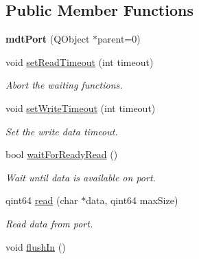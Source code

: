 \subsection*{Public Member Functions}
\begin{DoxyCompactItemize}
\item 
\hypertarget{classmdt_port_ac466eac9d1a54ea0e04c998660ad75ec}{
{\bfseries mdtPort} (QObject $\ast$parent=0)}
\label{classmdt_port_ac466eac9d1a54ea0e04c998660ad75ec}

\item 
void \hyperlink{classmdt_port_aa77b266f23744f1b53ae589f986be101}{setReadTimeout} (int timeout)
\begin{DoxyCompactList}\small\item\em Abort the waiting functions. \end{DoxyCompactList}\item 
\hypertarget{classmdt_port_a2acb6e7bedacdadf78ee735dc611abfa}{
void \hyperlink{classmdt_port_a2acb6e7bedacdadf78ee735dc611abfa}{setWriteTimeout} (int timeout)}
\label{classmdt_port_a2acb6e7bedacdadf78ee735dc611abfa}

\begin{DoxyCompactList}\small\item\em Set the write data timeout. \end{DoxyCompactList}\item 
bool \hyperlink{classmdt_port_af8737cc14667f6770af7be01759253e2}{waitForReadyRead} ()
\begin{DoxyCompactList}\small\item\em Wait until data is available on port. \end{DoxyCompactList}\item 
qint64 \hyperlink{classmdt_port_ad8a196bb21b6ca76dffb068a1692904a}{read} (char $\ast$data, qint64 maxSize)
\begin{DoxyCompactList}\small\item\em Read data from port. \end{DoxyCompactList}\item 
\hypertarget{classmdt_port_a2fea088c8e5ad4578f521a39c353f7c3}{
void \hyperlink{classmdt_port_a2fea088c8e5ad4578f521a39c353f7c3}{flushIn} ()}
\label{classmdt_port_a2fea088c8e5ad4578f521a39c353f7c3}


\end{DoxyCompactItemize}
